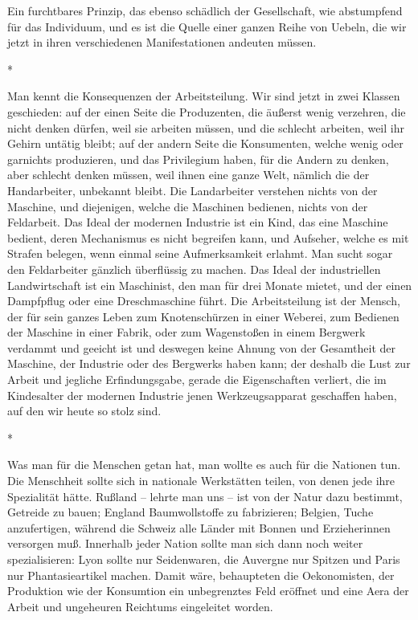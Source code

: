 \documentclass{scrbook}
\begin{document}
Ein furchtbares Prinzip, das ebenso schädlich der Gesellschaft, wie abstumpfend für das Individuum, und es ist die Quelle einer ganzen Reihe von Uebeln, die wir jetzt in ihren verschiedenen Manifestationen andeuten müssen.

\begin{center}*\end{center}

Man kennt die Konsequenzen der Arbeitsteilung. Wir sind jetzt in zwei Klassen geschieden: auf der einen Seite die Produzenten, die äußerst wenig verzehren, die nicht denken dürfen, weil sie arbeiten müssen, und die schlecht arbeiten, weil ihr Gehirn untätig bleibt; auf der andern Seite die Konsumenten, welche wenig oder garnichts produzieren, und das Privilegium haben, für die Andern zu denken, aber schlecht denken müssen, weil ihnen eine ganze Welt, nämlich die der Handarbeiter, unbekannt bleibt. Die Landarbeiter verstehen nichts von der Maschine, und diejenigen, welche die Maschinen bedienen, nichts von der Feldarbeit. Das Ideal der modernen Industrie ist ein Kind, das eine Maschine bedient, deren Mechanismus es nicht begreifen kann, und Aufseher, welche es mit Strafen belegen, wenn einmal seine Aufmerksamkeit erlahmt. Man sucht sogar den Feldarbeiter gänzlich überflüssig zu machen. Das Ideal der industriellen Landwirtschaft ist ein Maschinist, den man für drei Monate mietet, und der einen Dampfpflug oder eine Dreschmaschine führt. Die Arbeitsteilung ist der Mensch, der für sein ganzes Leben zum Knotenschürzen in einer Weberei, zum Bedienen der Maschine in einer Fabrik, oder zum Wagenstoßen in einem Bergwerk verdammt und geeicht ist und deswegen keine Ahnung von der Gesamtheit der Maschine, der Industrie oder des Bergwerks haben kann; der deshalb die Lust zur Arbeit und jegliche Erfindungsgabe, gerade die Eigenschaften verliert, die im Kindesalter der modernen Industrie jenen Werkzeugsapparat geschaffen haben, auf den wir heute so stolz sind.

\begin{center}*\end{center}

Was man für die Menschen getan hat, man wollte es auch für die Nationen tun. Die Menschheit sollte sich in nationale Werkstätten teilen, von denen jede ihre Spezialität hätte. Rußland – lehrte man uns – ist von der Natur dazu bestimmt, Getreide zu bauen; England Baumwollstoffe zu fabrizieren; Belgien, Tuche anzufertigen, während die Schweiz alle Länder mit Bonnen und Erzieherinnen versorgen muß. Innerhalb jeder Nation sollte man sich dann noch weiter spezialisieren: Lyon sollte nur Seidenwaren, die Auvergne nur Spitzen und Paris nur Phantasieartikel machen. Damit wäre, behaupteten die Oekonomisten, der Produktion wie der Konsumtion ein unbegrenztes Feld eröffnet und eine Aera der Arbeit und ungeheuren Reichtums eingeleitet worden.
\end{document}
